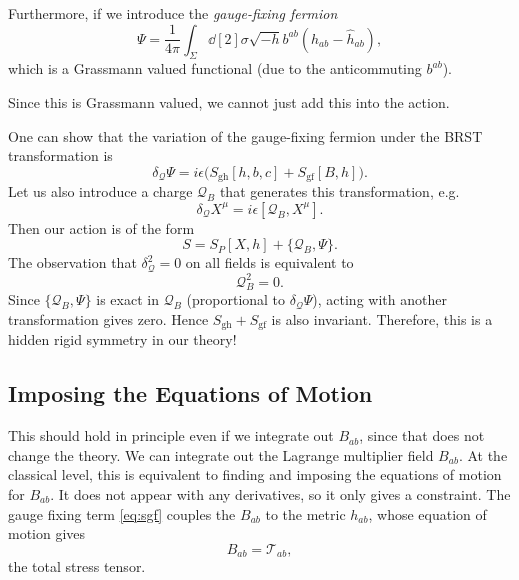 \begin{definition}
  Furthermore, if we introduce the \emph{gauge-fixing fermion}
  \begin{equation}
    \label{eq:gf-ferm}
    \Psi = \frac{1}{4\pi} \int_\Sigma \dd[2]{\sigma} \sqrt{-h} b^{ab} (h_{ab} - \hat{h}_{ab}),
  \end{equation}
  which is a Grassmann valued functional (due to the anticommuting $b^{ab}$).
\end{definition}
\begin{remark}
  Since this is Grassmann valued, we cannot just add this into the action.
\end{remark}
One can show that the variation of the gauge-fixing fermion under the BRST transformation is
\begin{equation}
  \delta_{\mathcal{Q}} \Psi = i \epsilon \bigl( S_{\text{gh}}[h, b, c] + S_{\text{gf}}[B, h] \bigr).
\end{equation}
Let us also introduce a charge $\mathcal{Q}_B$ that generates this transformation, e.g.
\begin{equation}
  \delta_{\mathcal{Q}} X^{\mu} = i \epsilon [\mathcal{Q}_B, X^{\mu}].
\end{equation}
Then our action is of the form
\begin{equation}
  S = S_P[X, h] + \{\mathcal{Q}_B, \Psi\}.
\end{equation}
The observation that $\delta^2_{\mathcal{Q}} = 0$ on all fields is equivalent to
\begin{equation}
  \mathcal{Q}^2_B = 0.
\end{equation}
Since $\{\mathcal{Q}_B, \Psi\}$ is exact in $\mathcal{Q}_B$ (proportional to $\delta_\mathcal{Q} \Psi$), acting with another transformation gives zero. Hence $S_{\text{gh}} + S_{\text{gf}}$ is also invariant.
Therefore, this is a hidden rigid symmetry in our theory!

\subsection*{Imposing the Equations of Motion}%

This should hold in principle even if we integrate out $B_{ab}$, since that does not change the theory.
We can integrate out the Lagrange multiplier field $B_{ab}$. At the classical level, this is equivalent to finding and imposing the equations of motion for $B_{ab}$. It does not appear with any derivatives, so it only gives a constraint.
The gauge fixing term \eqref{eq:sgf} couples the $B_{ab}$ to the metric $h_{ab}$, whose equation of motion gives
\begin{equation}
  B_{ab} = \mathcal{T}_{ab},
\end{equation}
the total stress tensor.

